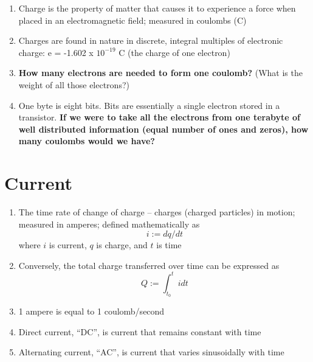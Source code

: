\documentclass[11pt]{book}
\begin{document}
\begin{enumerate}
	\item Charge is the property of matter that causes it to experience a force when placed in an electromagnetic field; measured in coulombs (C)
	\item 	Charges are found in nature in discrete, integral multiples of electronic charge: e  = -1.602 x $10^{-19}$ C (the charge of one electron)
	\item \textbf{How many electrons are needed to form one coulomb?} (What is the weight of all those electrons?) 
	\item One byte is eight bits. Bits are essentially a single electron stored in a transistor. \textbf{If we were to take all the electrons from one terabyte of well distributed information (equal number of ones and zeros), how many coulombs would we have?}
\end{enumerate}


\section{Current}
\begin{enumerate}
	\item The time rate of change of charge – charges (charged particles) in motion; measured in amperes; defined mathematically as
	\begin{equation}
	\label{i=dqdt}
		i := dq/dt
	\end{equation}
	where $i$ is current, $q$ is charge, and $t$ is time
	
	\item Conversely, the total charge transferred over time can be expressed as 
	\begin{equation}
	\label{q=it}
		Q := \int_{t_0}^{t}i dt
	\end{equation}

	\item 1 ampere is equal to 1 coulomb/second
	\item Direct current, ``DC'', is current that remains constant with time
	\item Alternating current, ``AC'', is current that varies sinusoidally with time
\end{enumerate}
\end{document}

